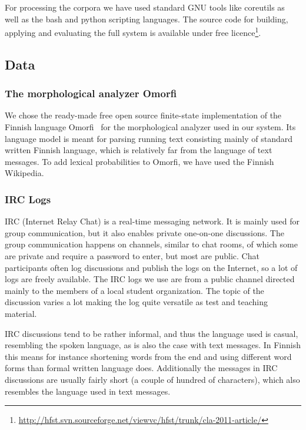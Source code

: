\documentclass[a4paper,conference]{IEEEtran}
\begin{document}
For processing the corpora we have used standard GNU tools like
coreutils as well as the bash and python scripting languages. The
source code for building, applying and evaluating the full system is
available under free
licence\footnote{\url{http://hfst.svn.sourceforge.net/viewvc/hfst/trunk/cla-2011-article/}}.

\subsection{Data}
\label{sec:data}

\subsubsection{The morphological analyzer Omorfi} 
We chose the ready-made free open source finite-state implementation
of the Finnish language Omorfi~\cite{pirinen/2011/nodalida} for the
morphological analyzer used in our system.  Its language model is
meant for parsing running text consisting mainly of standard written
Finnish language, which is relatively far from the language of text
messages. To add lexical probabilities to Omorfi, we have used the
Finnish Wikipedia.

\subsubsection{IRC Logs}
IRC (Internet Relay Chat) is a real-time messaging network. It is
mainly used for group communication, but it also enables private
one-on-one discussions. The group communication happens on channels,
similar to chat rooms, of which some are private and require a
password to enter, but most are public. Chat participants often log
discussions and publish the logs on the Internet, so a lot of logs are
freely available. The IRC logs we use are from a public channel
directed mainly to the members of a local student organization. The
topic of the discussion varies a lot making the log quite versatile as
test and teaching material.

IRC discussions tend to be rather informal, and thus the language used
is casual, resembling the spoken language, as is also the case with
text messages. In Finnish this means for instance shortening words from the
end and using different word forms than formal written language
does. Additionally the messages in IRC discussions are usually fairly
short (a couple of hundred of characters), which also resembles the
language used in text messages.
\end{document}
